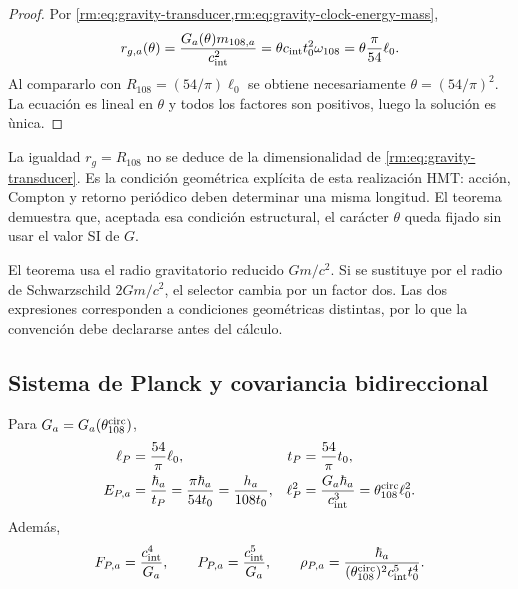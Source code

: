 \begin{proof}
Por \cref{rm:eq:gravity-transducer,rm:eq:gravity-clock-energy-mass},
\[
r_{g,a}(\theta)
=\frac{G_a(\theta)m_{108,a}}{c_{\rm int}^2}
=\theta c_{\rm int}t_0^2\omega_{108}
=\theta\frac{\pi}{54}\ell_0.
\]
Al compararlo con
\(R_{108}=(54/\pi)\ell_0\) se obtiene necesariamente
\(\theta=(54/\pi)^2\). La ecuaci\'on es lineal en \(\theta\) y todos los
factores son positivos, luego la soluci\'on es \`unica.
\end{proof}

La igualdad \(r_g=R_{108}\) no se deduce de la dimensionalidad de
\cref{rm:eq:gravity-transducer}. Es la condición geométrica explícita de esta
realizaci\'on HMT: acci\'on, Compton y retorno peri\'odico deben determinar una misma
longitud. El teorema demuestra que, aceptada esa condición estructural, el
carácter \(\theta\) queda fijado sin usar el valor SI de \(G\).

\begin{remark}
El teorema usa el radio gravitatorio reducido \(Gm/c^2\). Si se sustituye
por el radio de Schwarzschild \(2Gm/c^2\), el selector cambia por un factor
dos. Las dos expresiones corresponden a condiciones geom\'etricas distintas,
por lo que la convenci\'on debe declararse antes del c\'alculo.
\end{remark}

\subsection{Sistema de Planck y covariancia bidireccional}

\begin{corollary}
\label{rm:cor:gravity-planck-family}
Para \(G_a=G_a(\theta_{108}^{\rm circ})\),
\begin{align}
\ell_P&=\frac{54}{\pi}\ell_0,
&t_P&=\frac{54}{\pi}t_0,
\label{rm:eq:gravity-planck-length-time}\\
E_{P,a}&=\frac{\hbar_a}{t_P}
=\frac{\pi\hbar_a}{54t_0}
=\frac{h_a}{108t_0},
&\ell_P^2&=\frac{G_a\hbar_a}{c_{\rm int}^3}
=\theta_{108}^{\rm circ}\ell_0^2.
\label{rm:eq:gravity-planck-energy-area}
\end{align}
Adem\'as,
\begin{equation}
\label{rm:eq:gravity-planck-force-power-density}
F_{P,a}=\frac{c_{\rm int}^4}{G_a},
\qquad
P_{P,a}=\frac{c_{\rm int}^5}{G_a},
\qquad
\rho_{P,a}=\frac{\hbar_a}
{(\theta_{108}^{\rm circ})^2c_{\rm int}^5t_0^4}.
\end{equation}
\end{corollary}

